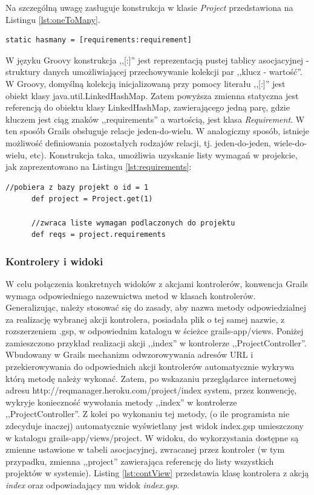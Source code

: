     Na szczególną uwagę zasługuje konstrukcja w klasie \emph{Project} przedstawiona na Listingu \ref{lst:oneToMany}.

    \begin{lstlisting}[caption={Relacja jeden-do-wielu}, label={lst:oneToMany}]
      static hasmany = [requirements:requirement]
    \end{lstlisting}

    W języku Groovy konstrukcja ,,[:]'' jest reprezentacją pustej tablicy asocjacyjnej - struktury danych umożliwiającej przechowywanie kolekcji par ,,klucz - wartość''. W Groovy, domyślną kolekcją inicjalizowaną przy pomocy literału ,,[:]'' jest obiekt klasy java.util.LinkedHashMap. Zatem powyższa zmienna statyczna jest referencją do obiektu klasy LinkedHashMap, zawierającego jedną parę, gdzie kluczem jest ciąg znaków ,,requirements'' a wartością, jest klasa \emph{Requirement}. W ten sposób Grails obsługuje relacje jeden-do-wielu. W analogiczny sposób, istnieje możliwość definiowania pozostałych rodzajów relacji, tj. jeden-do-jeden, wiele-do-wielu, etc). Konstrukcja taka, umożliwia uzyskanie listy wymagań w projekcie, jak zaprezentowano na Listingu \ref{lst:requirements}: 

    \begin{lstlisting}[caption={Wymagania przypisane do projektu}, label={lst:requirements}]
      //pobiera z bazy projekt o id = 1
      def project = Project.get(1)

      //zwraca liste wymagan podlaczonych do projektu
      def reqs = project.requirements 
    \end{lstlisting}
    
      
    \subsubsection{Kontrolery i widoki}

    W celu połączenia konkretnych widoków z akcjami kontrolerów, konwencja Grails wymaga odpowiedniego nazewnictwa metod w klasach kontrolerów. Generalizując, należy stosować się do zasady, aby nazwa metody odpowiedzialnej za realizację wybranej akcji kontrolera, posiadała plik o tej samej nazwie, z rozszerzeniem .gsp, w odpowiednim katalogu w ścieżce grails-app/views. Poniżej zamieszczono przykład realizacji akcji ,,index'' w kontrolerze ,,ProjectController''. Wbudowany w Grails mechanizm odwzorowywania adresów URL i przekierowywania do odpowiednich akcji kontrolerów automatycznie wykrywa którą metodę należy wykonać. Zatem, po wskazaniu przeglądarce internetowej adresu http://reqmanager.heroku.com/project/index system, przez konwencję, wykryje konieczność wywołania metody ,,index'' w kontrolerze ,,ProjectController''. Z kolei po wykonaniu tej metody, (o ile programista nie zdecyduje inaczej) automatycznie wyświetlany jest widok index.gsp umieszczony w katalogu grails-app/views/project. W widoku, do wykorzystania dostępne są zmienne ustawione w tabeli asocjacyjnej, zwracanej przez kontroler (w tym przypadku, zmienna ,,project'' zawierająca referencję do listy wszystkich projektów w systemie). Listing \ref{lst:contView} przedstawia klasę kontrolera z akcją \emph{index} oraz odpowiadający mu widok \emph{index.gsp}.


